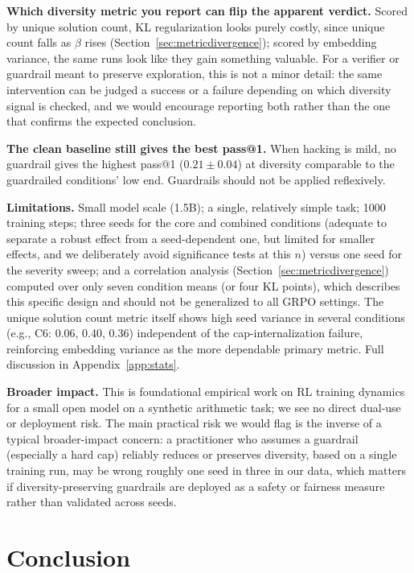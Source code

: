 \documentclass{article}
\begin{document}
\textbf{Which diversity metric you report can flip the apparent verdict.} Scored by unique solution count, KL regularization looks purely costly, since unique count falls as $\beta$ rises (Section~\ref{sec:metricdivergence}); scored by embedding variance, the same runs look like they gain something valuable. For a verifier or guardrail meant to preserve exploration, this is not a minor detail: the same intervention can be judged a success or a failure depending on which diversity signal is checked, and we would encourage reporting both rather than the one that confirms the expected conclusion.

\textbf{The clean baseline still gives the best pass@1.} When hacking is mild, no guardrail gives the highest pass@1 ($0.21\pm0.04$) at diversity comparable to the guardrailed conditions' low end. Guardrails should not be applied reflexively.

\textbf{Limitations.} Small model scale (1.5B); a single, relatively simple task; 1000 training steps; three seeds for the core and combined conditions (adequate to separate a robust effect from a seed-dependent one, but limited for smaller effects, and we deliberately avoid significance tests at this $n$) versus one seed for the severity sweep; and a correlation analysis (Section~\ref{sec:metricdivergence}) computed over only seven condition means (or four KL points), which describes this specific design and should not be generalized to all GRPO settings. The unique solution count metric itself shows high seed variance in several conditions (e.g., C6: 0.06, 0.40, 0.36) independent of the cap-internalization failure, reinforcing embedding variance as the more dependable primary metric. Full discussion in Appendix~\ref{app:stats}.

\textbf{Broader impact.} This is foundational empirical work on RL training dynamics for a small open model on a synthetic arithmetic task; we see no direct dual-use or deployment risk. The main practical risk we would flag is the inverse of a typical broader-impact concern: a practitioner who assumes a guardrail (especially a hard cap) reliably reduces or preserves diversity, based on a single training run, may be wrong roughly one seed in three in our data, which matters if diversity-preserving guardrails are deployed as a safety or fairness measure rather than validated across seeds.

\section{Conclusion}
\end{document}
